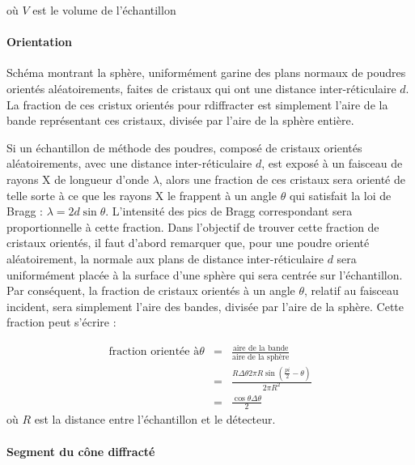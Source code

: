 où $V$ est le volume de l'échantillon

\paragraph{Orientation}

\begin{marginfigure}
    \TODO
    \caption{Schéma montrant la sphère, uniformément garine des plans normaux de poudres orientés aléatoirements, faites de cristaux qui ont une distance inter-réticulaire $d$. La fraction de ces cristux orientés pour rdiffracter est simplement l'aire de la bande représentant ces cristaux, divisée par l'aire de la sphère entière.}
    \label{fig:}
\end{marginfigure}

Si un échantillon de méthode des poudres, composé de cristaux orientés aléatoirements, avec une distance inter-réticulaire $d$, est exposé à un faisceau de rayons X de longueur d'onde $\lambda$, alors une fraction de ces cristaux sera orienté de telle sorte à ce que les rayons X le frappent à un angle $\theta$ qui satisfait la loi de Bragg : $\lambda = 2d \sin \theta$. L'intensité des pics de Bragg correspondant sera proportionnelle à cette fraction. Dans l'objectif de trouver cette fraction de cristaux orientés, il faut d'abord remarquer que, pour une poudre orienté aléatoirement, la normale aux plans de distance inter-réticulaire $d$ sera uniformément placée à la surface d'une sphère qui sera centrée sur l'échantillon. Par conséquent, la fraction de cristaux orientés à un angle $\theta$, relatif au faisceau incident, sera simplement l'aire des bandes, divisée par l'aire de la sphère. Cette fraction peut s'écrire :

\begin{eqnarray}
    \text{fraction orientée à} \theta & = & \frac{\text{aire de la bande}}{\text{aire de la sphère}} \\
    & = & \frac{R\Delta \theta 2 \pi R \sin \left(\frac{pi}{2} - \theta \right)}{2\pi R^2}\\
    & = & \frac{\cos\theta \Delta \theta}{2}
    \label{eq:orientation}
\end{eqnarray}
où $R$ est la distance entre l'échantillon et le détecteur.

\paragraph{Segment du cône diffracté}

\begin{marginfigure}
    \TODO
    \caption{}
    \label{fig:diffconeseg}
\end{marginfigure}


